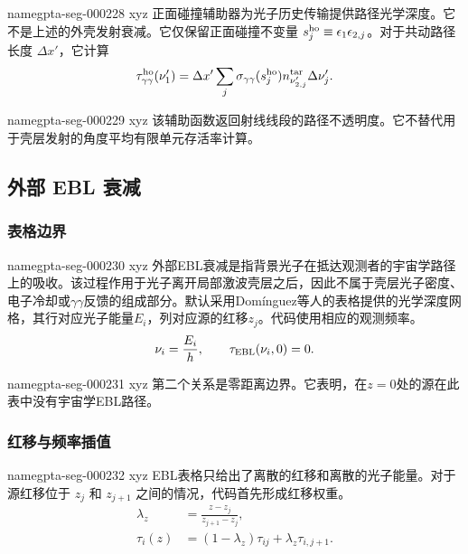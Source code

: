 \documentclass[twocolumn]{aastex702}
\makeatletter
\providecommand{\gptareaderanchor}[1]{\pdfdest name{#1} xyz}%
\providecommand{\gptareaderanchor}[1]{\special{pdf:dest (#1) [ @thispage /XYZ @xpos @ypos null ]}}%
\makeatother
\begin{document}
\gptareaderanchor{gpta-seg-000228}%
正面碰撞辅助器为光子历史传输提供路径光学深度。它不是上述的外壳发射衰减。它仅保留正面碰撞不变量 \(s_j^{\rm ho}\equiv\epsilon_1\epsilon_{2,j}\)。对于共动路径长度 \(\Delta x'\)，它计算
\begin{equation}
\begin{aligned}
\tau_{\gamma\gamma}^{\rm ho}(\nu_1')=
\Delta x'
\sum_j \sigma_{\gamma\gamma}(s_j^{\rm ho})
n_{\nu_{2,j}'}^{\rm tar}\Delta\nu_j' .
\end{aligned}
\end{equation}

\gptareaderanchor{gpta-seg-000229}%
该辅助函数返回射线线段的路径不透明度。它不替代用于壳层发射的角度平均有限单元存活率计算。

\subsection{外部 EBL 衰减}

\subsubsection{表格边界}


\gptareaderanchor{gpta-seg-000230}%
外部EBL衰减是指背景光子在抵达观测者的宇宙学路径上的吸收。该过程作用于光子离开局部激波壳层之后，因此不属于壳层光子密度、电子冷却或\(\gamma\gamma\)反馈的组成部分。默认采用Domínguez等人的表格\citep{Dominguez2011EBL}提供的光学深度网格，其行对应光子能量\(E_i\)，列对应源的红移\(z_j\)。代码使用相应的观测频率。
\begin{equation}
\begin{aligned}
\nu_i=\frac{E_i}{h}, \qquad
\tau_{\rm EBL}(\nu_i,0)=0 .
\end{aligned}
\end{equation}

\gptareaderanchor{gpta-seg-000231}%
第二个关系是零距离边界。它表明，在\(z=0\)处的源在此表中没有宇宙学EBL路径。

\subsubsection{红移与频率插值}


\gptareaderanchor{gpta-seg-000232}%
EBL表格只给出了离散的红移和离散的光子能量。对于源红移位于 \(z_j\) 和 \(z_{j+1}\) 之间的情况，代码首先形成红移权重。
\begin{equation}
\begin{aligned}
\lambda_z&=\frac{z-z_j}{z_{j+1}-z_j},\\
\tau_i(z)&=(1-\lambda_z)\tau_{ij}
+\lambda_z\tau_{i,j+1}.
\end{aligned}
\end{equation}
\end{document}
